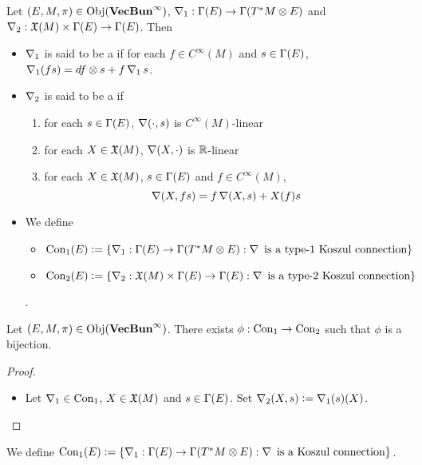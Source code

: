 \documentclass{book}
\begin{document}
	\begin{defn}
		Let $(E, M, \pi) \in \operatorname{Obj}(\operatorname*{\text{\textbf{VecBun}}^{\infty}})$, $\operatorname{\nabla}_1 : \Gamma(E) \rightarrow \Gamma(T^*M \otimes E)$ and $\operatorname{\nabla}_2: \mathfrak{X}(M) \times \Gamma(E) \rightarrow \Gamma(E)$. Then 
		\begin{itemize}
			\item $\operatorname{\nabla}_1$ is said to be a  if for each $f \in C^{\infty}(M)$ and $s \in \Gamma(E)$, $\operatorname{\nabla}_1 (fs) = df \otimes s + f \operatorname{\nabla}_1 s$.
			\item $\operatorname{\nabla}_2$ is said to be a  if 
			\begin{enumerate}
				\item for each $s \in \Gamma(E)$, $\operatorname{\nabla}(\cdot, s)$ is $C^{\infty}(M)$-linear
				\item for each $X \in \mathfrak{X}(M)$, $\operatorname{\nabla}(X, \cdot)$ is $\mathbb{R}$-linear
				\item for each $X \in \mathfrak{X}(M)$, $s \in \Gamma(E)$ and $f \in C^{\infty}(M)$, 
				$$\operatorname{\nabla}(X, fs) = f \operatorname{\nabla}(X, s) + X(f) s$$ 
			\end{enumerate}
			\item We define 
			\begin{itemize}
				\item $\text{Con}_1(E) \vcentcolon= \{\operatorname{\nabla}_1 : \Gamma(E) \rightarrow \Gamma(T^*M \otimes E): \operatorname{\nabla} \text{ is a type-$1$ Koszul connection}\}$ 
				\item $\text{Con}_2(E) \vcentcolon= \{\operatorname{\nabla}_2: \mathfrak{X}(M) \times \Gamma(E) \rightarrow \Gamma(E): \operatorname{\nabla} \text{ is a type-$2$ Koszul connection}\}$ 
			\end{itemize}.
		\end{itemize}
	\end{defn}

	\begin{ex}
		Let $(E, M, \pi) \in \operatorname{Obj}(\operatorname*{\text{\textbf{VecBun}}^{\infty}})$. There exists $\phi: \text{Con}_1 \rightarrow \text{Con}_2$ such that $\phi$ is a bijection. 
	\end{ex}

	\begin{proof}
		\begin{itemize}
			\item Let $\operatorname{\nabla}_1 \in \text{Con}_1$, $X \in \mathfrak{X}(M)$ and $s \in \Gamma(E)$. Set $\operatorname{\nabla}_2(X, s) \vcentcolon= \operatorname{\nabla}_1(s)(X)$. 
		\end{itemize}
	\end{proof}

	\begin{ex}
		We define $\text{Con}_1(E) \vcentcolon= \{\operatorname{\nabla}_1 : \Gamma(E) \rightarrow \Gamma(T^*M \otimes E): \operatorname{\nabla} \text{ is a Koszul connection}\}$.
	\end{ex}
\end{document}
